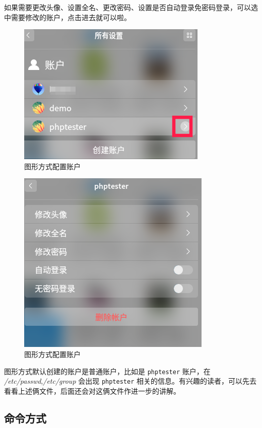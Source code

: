 \documentclass[doctor,openright,twoside]{sjtuthesis}
\newcommand{\passthrough}[1]{#1}
\theoremstyle{plain}
\theoremstyle{definition}
\theoremstyle{remark}
\theoremstyle{ocrenumbox}
\theoremstyle{plain}
\begin{document}
如果需要更改头像、设置全名、更改密码、设置是否自动登录免密码登录，可以选中需要修改的账户，点击进去就可以啦。

\begin{figure}
\centering
\includegraphics{images/manager-user-account-03.png}
\caption{图形方式配置账户}
\end{figure}

\begin{figure}
\centering
\includegraphics{images/manager-user-account-04.png}
\caption{图形方式配置账户}
\end{figure}

图形方式默认创建的账户是普通账户，比如是
\passthrough{\lstinline!phptester!} 账户，在
\emph{/etc/passwd},\emph{/etc/group} 会出现
\passthrough{\lstinline!phptester!}
相关的信息。有兴趣的读者，可以先去看看上述俩文件，后面还会对这俩文件作进一步的讲解。

\subsection{命令方式}
\end{document}
